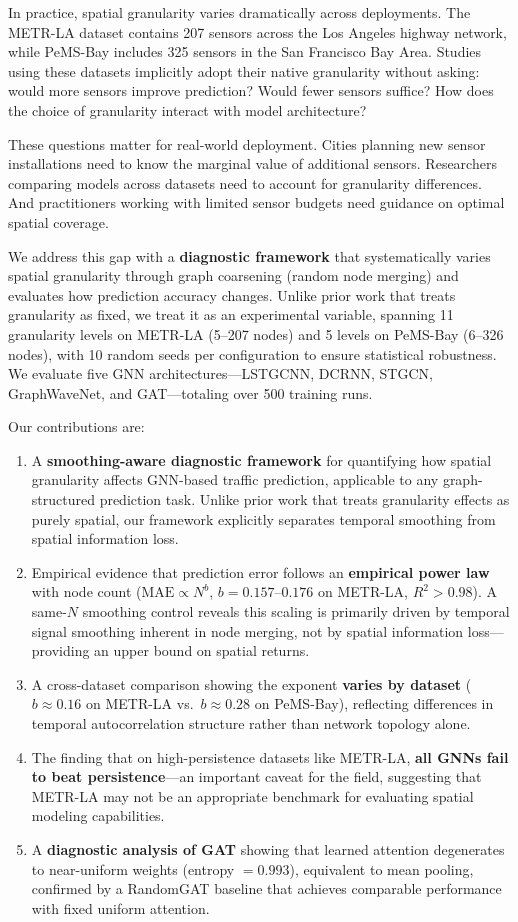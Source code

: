 \documentclass[letterpaper]{article}
\begin{document}
In practice, spatial granularity varies dramatically across deployments. The METR-LA dataset contains 207 sensors across the Los Angeles highway network, while PeMS-Bay includes 325 sensors in the San Francisco Bay Area. Studies using these datasets implicitly adopt their native granularity without asking: would more sensors improve prediction? Would fewer sensors suffice? How does the choice of granularity interact with model architecture?

These questions matter for real-world deployment. Cities planning new sensor installations need to know the marginal value of additional sensors. Researchers comparing models across datasets need to account for granularity differences. And practitioners working with limited sensor budgets need guidance on optimal spatial coverage.

We address this gap with a \textbf{diagnostic framework} that systematically varies spatial granularity through graph coarsening (random node merging) and evaluates how prediction accuracy changes. Unlike prior work that treats granularity as fixed, we treat it as an experimental variable, spanning 11 granularity levels on METR-LA (5--207 nodes) and 5 levels on PeMS-Bay (6--326 nodes), with 10 random seeds per configuration to ensure statistical robustness. We evaluate five GNN architectures---LSTGCNN, DCRNN, STGCN, GraphWaveNet, and GAT---totaling over 500 training runs.

Our contributions are:

\begin{enumerate}
    \item A \textbf{smoothing-aware diagnostic framework} for quantifying how spatial granularity affects GNN-based traffic prediction, applicable to any graph-structured prediction task. Unlike prior work that treats granularity effects as purely spatial, our framework explicitly separates temporal smoothing from spatial information loss.
    \item Empirical evidence that prediction error follows an \textbf{empirical power law} with node count ($\text{MAE} \propto N^b$, $b = 0.157$--$0.176$ on METR-LA, $R^2 > 0.98$). A same-$N$ smoothing control reveals this scaling is primarily driven by temporal signal smoothing inherent in node merging, not by spatial information loss---providing an upper bound on spatial returns.
    \item A cross-dataset comparison showing the exponent \textbf{varies by dataset} ($b \approx 0.16$ on METR-LA vs.\ $b \approx 0.28$ on PeMS-Bay), reflecting differences in temporal autocorrelation structure rather than network topology alone.
    \item The finding that on high-persistence datasets like METR-LA, \textbf{all GNNs fail to beat persistence}---an important caveat for the field, suggesting that METR-LA may not be an appropriate benchmark for evaluating spatial modeling capabilities.
    \item A \textbf{diagnostic analysis of GAT} showing that learned attention degenerates to near-uniform weights (entropy $= 0.993$), equivalent to mean pooling, confirmed by a RandomGAT baseline that achieves comparable performance with fixed uniform attention.
\end{enumerate}
\end{document}

